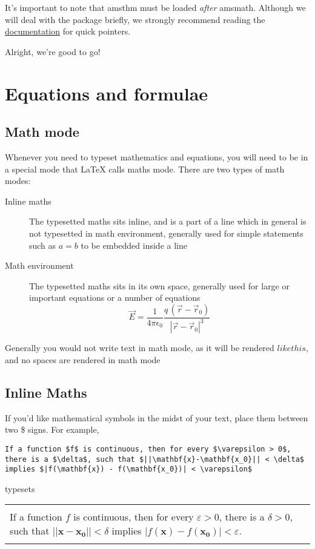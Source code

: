 \documentclass[12pt, letterpaper]{article}
\theoremstyle{remark}
\renewenvironment{boxed}
    {\begin{center}
    \begin{tabular}{|p{0.9\textwidth}|}
    \hline\\
    }
    { 
    \\\\\hline
    \end{tabular} 
    \end{center}
    }
\begin{document}
It's important to note that amsthm must be loaded \emph{after} amsmath. Although we will deal with the package briefly, we strongly recommend reading the \href{http://www.ams.org/arc/tex/amscls/amsthdoc.pdf}{documentation}\cite{amsthm-doc} for quick pointers. 

Alright, we're good to go!

\newpage

\section{Equations and formulae}
\subsection{Math mode}
Whenever you need to typeset mathematics and equations, you will need to be in a special mode that \LaTeX{} calls maths mode. There are two types of math modes:
\begin{description}
    \item[Inline maths] The typesetted maths sits inline, and is a part of a line which in general is not typesetted in math environment, generally used for simple statements such as $a=b$ to be embedded inside a line
    \item[Math environment] The typesetted maths sits in its own space, generally used for large or important equations or a number of equations
    \begin{equation*}
        \vec{E} = \frac{1}{4\pi\epsilon_0}\frac{q\,(\vec{r}-\vec{r}_0)}{|\vec{r}-\vec{r}_0|^3}
    \end{equation*}
\end{description}

Generally you would not write text in math mode, as it will be rendered $like this$, and no spaces are rendered in math mode
\subsection{Inline Maths}
If you'd like mathematical symbols in the midst of your text, place them between two \$ signs. For example,
\begin{lstlisting}
If a function $f$ is continuous, then for every $\varepsilon > 0$, there is a $\delta$, such that $||\mathbf{x}-\mathbf{x_0}|| < \delta$ implies $|f(\mathbf{x}) - f(\mathbf{x_0})| < \varepsilon$
\end{lstlisting}
typesets 
\begin{boxed}
If a function $f$ is continuous, then for every $\varepsilon > 0$, there is a $\delta > 0$, such that $||\mathbf{x}-\mathbf{x_0}|| < \delta$ implies $|f(\mathbf{x}) - f(\mathbf{x_0})| < \varepsilon$.
\end{boxed}
\end{document}
